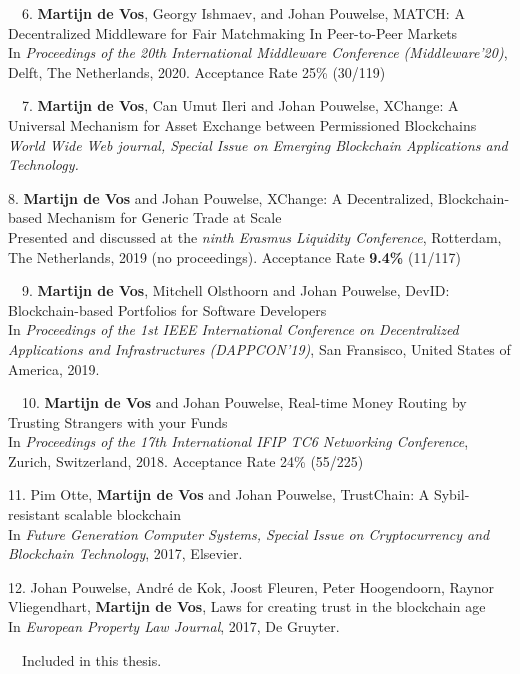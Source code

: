 \begin{etaremune}
{\item[\faFileTextO~~6.] \textbf{Martijn de Vos}, Georgy Ishmaev, and Johan Pouwelse, MATCH: A Decentralized Middleware for Fair Matchmaking In
Peer-to-Peer Markets\\
In \emph{Proceedings of the 20th International Middleware Conference (Middleware'20)}, Delft, The Netherlands, 2020. Acceptance Rate 25\% (30/119)

\item[\faFileTextO~~7.] \textbf{Martijn de Vos}, Can Umut Ileri and Johan Pouwelse, XChange: A Universal Mechanism for Asset Exchange between Permissioned Blockchains\\
\emph{World Wide Web journal, Special Issue on Emerging Blockchain Applications and Technology.}

\item[8.] \textbf{Martijn de Vos} and Johan Pouwelse, XChange: A Decentralized, Blockchain-based Mechanism for Generic Trade at Scale\\
Presented and discussed at the \emph{ninth Erasmus Liquidity Conference}, Rotterdam, The Netherlands, 2019 (no proceedings). Acceptance Rate \textbf{9.4\%} (11/117)

\item[\faFileTextO~~9.] \textbf{Martijn de Vos}, Mitchell Olsthoorn and Johan Pouwelse, DevID: Blockchain-based Portfolios for Software Developers\\
In \emph{Proceedings of the 1st IEEE International Conference on Decentralized Applications and Infrastructures (DAPPCON'19)}, San Fransisco, United States of America, 2019.

\item[\faFileTextO~~10.] \textbf{Martijn de Vos} and Johan Pouwelse, Real-time Money Routing by Trusting Strangers with your Funds\\
In \emph{Proceedings of the 17th International IFIP TC6 Networking Conference}, Zurich, Switzerland, 2018. Acceptance Rate 24\% (55/225)

\item[11.] Pim Otte, \textbf{Martijn de Vos} and Johan Pouwelse, TrustChain: A Sybil-resistant scalable blockchain\\
In \emph{Future Generation Computer Systems, Special Issue on Cryptocurrency and Blockchain Technology}, 2017, Elsevier.

\item[12.] Johan Pouwelse, André de Kok, Joost Fleuren, Peter Hoogendoorn, Raynor Vliegendhart, \textbf{Martijn de Vos}, Laws for creating trust in the blockchain age\\
In \emph{European Property Law Journal}, 2017, De Gruyter.

}\end{etaremune}

\vspace{0.5cm}
\noindent
\faFileTextO~~Included in this thesis.\\

